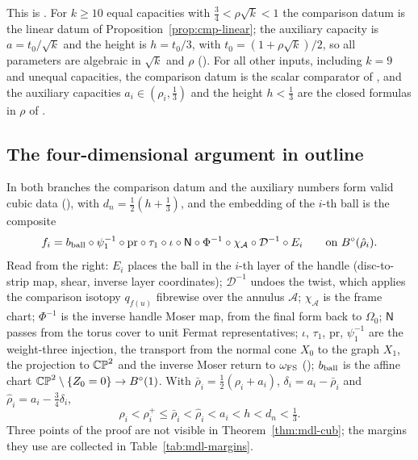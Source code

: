 This is . For $k\ge10$ equal capacities with $\frac34<\rho\sqrt k<1$ the comparison
datum is the linear datum of Proposition~\ref{prop:cmp-linear}; the auxiliary capacity is $a=t_0/\sqrt k$ and the
height is $h=t_0/3$, with $t_0=(1+\rho\sqrt k)/2$, so all parameters are algebraic in $\sqrt k$ and $\rho$
(). For all other inputs, including $k=9$ and unequal capacities, the comparison datum is
the scalar comparator of , and the auxiliary capacities $a_i\in(\rho_i,\frac13)$ and the height
$h<\frac13$ are the closed formulas in $\rho$ of .

\subsection{The four-dimensional argument in outline}\label{sec:mdl-cub-outline}

In both branches the comparison datum and the auxiliary numbers form valid cubic data
(), with $d_n=\frac12(h+\frac13)$, and the embedding of the $i$-th ball is the composite
\begin{equation}\label{eq:mdl-cub-chain}
 f_i=b_{\rm ball}\circ\psi_1^{-1}\circ\mathrm{pr}\circ\tau_1\circ\iota\circ\mathsf N\circ\Phi^{-1}\circ\chi_{\mathcal A}
 \circ\mathcal D^{-1}\circ E_i\qquad\text{on }B^{\circ}(\hat\rho_i).
\end{equation}
Read from the right: $E_i$ places the ball in the $i$-th layer of the handle (disc-to-strip map, shear, inverse layer
coordinates); $\mathcal D^{-1}$ undoes the twist, which applies the comparison isotopy $q_{f(u)}$ fibrewise over the
annulus $\mathcal A$; $\chi_{\mathcal A}$ is the frame chart; $\Phi^{-1}$ is the inverse handle Moser map, from the final
form back to $\Omega_0$; $\mathsf N$ passes from the torus cover to unit Fermat representatives; $\iota$, $\tau_1$,
$\mathrm{pr}$, $\psi_1^{-1}$ are the weight-three injection, the transport from the normal cone $X_0$ to the graph $X_1$,
the projection to $\mathbb{CP}^2$ and the inverse Moser return to $\omega_{\rm FS}$ ();
$b_{\rm ball}$ is the affine chart $\mathbb{CP}^2\setminus\{Z_0=0\}\to B^{\circ}(1)$. With $\bar\rho_i=\frac12(\rho_i+a_i)$,
$\delta_i=a_i-\bar\rho_i$ and $\hat\rho_i=a_i-\frac34\delta_i$,
\[
 \rho_i<\rho_i^+\le\bar\rho_i<\hat\rho_i<a_i<h<d_n<\tfrac13 .
\]
Three points of the proof are not visible in Theorem~\ref{thm:mdl-cub}; the margins they use are collected in
Table~\ref{tab:mdl-margins}.

